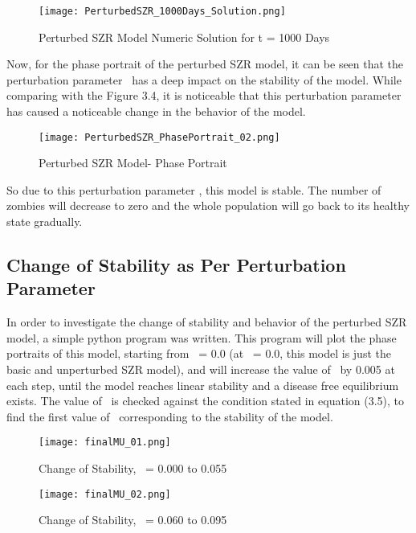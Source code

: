 \begin{figure}[H]
\centering
\texttt{[image: PerturbedSZR\_1000Days\_Solution.png]}
\caption{Perturbed SZR Model Numeric Solution for t = 1000 Days}
\label{fig:Perturbed SZR Model 1000 Days}
\end{figure}

Now, for the phase portrait of the perturbed SZR model, it can be seen that the perturbation parameter \textmu \ has a deep impact on the stability of the model. While comparing with the Figure 3.4, it is noticeable that this perturbation parameter has caused a noticeable change in the behavior of the model. \\

\begin{figure}[H]
\centering
\texttt{[image: PerturbedSZR\_PhasePortrait\_02.png]}
\caption{Perturbed SZR Model- Phase Portrait}
\label{fig:Perturbed SZR Model Phase Portrait}
\end{figure}

So due to this perturbation parameter \textmu, this model is stable. The number of zombies will decrease to zero and the whole population will go back to its healthy state gradually. 

\pagebreak
\subsection{Change of Stability as Per Perturbation Parameter}

In order to investigate the change of stability and behavior of the perturbed SZR model, a simple python program was written. This program will plot the phase portraits of this model, starting from \textmu \ = 0.0 (at \textmu \ = 0.0, this model is just the basic and unperturbed SZR model), and will increase the value of \textmu \ by 0.005 at each step, until the model reaches linear stability and a disease free equilibrium exists. The value of \textmu \ is checked against the condition stated in equation (3.5), to find the first value of \textmu \ corresponding to the stability of the model. \\

\begin{figure}[H]
\centering
\texttt{[image: finalMU\_01.png]}
\caption{Change of Stability, \textmu \ = 0.000 to 0.055}
\label{fig:Perturbed SZR Change of Perturbation 01}
\end{figure}

\begin{figure}[H]
\centering
\texttt{[image: finalMU\_02.png]}
\caption{Change of Stability, \textmu \ = 0.060 to 0.095}
\label{fig:Perturbed SZR Change of Perturbation 02}
\end{figure}

